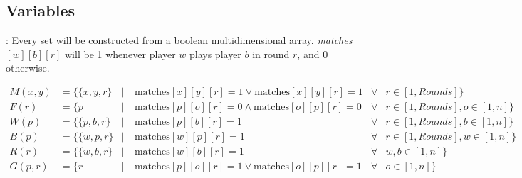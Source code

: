 \documentclass[
9pt,
aspectratio=169,
xcolor=table,
]{beamer}
\begin{document}
\subsection{Variables}
\begin{frame}{\secname: \subsecname}
    Every set will be constructed from a boolean multidimensional array. \textit{matches}$[w][b][r]$ will be 1 whenever player $w$ plays player $b$ in round $r$, and 0 otherwise.
    \begin{tcolorbox}[colback=gray!30, colframe=Veronablue, arc=0pt, outer arc=0pt, title = \textbf{Set constructions}]
	\begin{align*}
	    M(x, y)   &= \{ \{x, y, r\} &|& \ \text{matches}[x][y][r] = 1 \lor \text{matches}[x][y][r] = 1   &\forall &r \in [1, Rounds]\}\\
	    F(r)      &= \{ p           &|& \ \text{matches}[p][o][r] = 0 \land \text{matches}[o][p][r] = 0  &\forall &r \in [1, Rounds], o \in [1, n]\}\\
	    W(p)      &= \{ \{p, b, r\} &|& \ \text{matches}[p][b][r] = 1                                    &\forall &r \in [1, Rounds], b \in [1, n]\}\\
	    B(p)      &= \{ \{w, p, r\} &|& \ \text{matches}[w][p][r] = 1                                    &\forall &r \in [1, Rounds], w \in [1, n]\}\\
	    R(r)      &= \{ \{w, b, r\} &|& \ \text{matches}[w][b][r] = 1                                    &\forall &w, b \in [1, n]\}\\
	    G(p, r)   &= \{ r           &|& \ \text{matches}[p][o][r] = 1  \lor \text{matches}[o][p][r] = 1  &\forall &o \in [1, n]\}\\
	\end{align*}
    \end{tcolorbox}
\end{frame}
\end{document}
